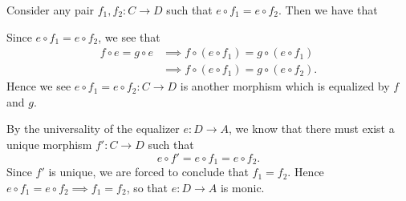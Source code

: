     \begin{prf}
    Consider any pair $f_1, f_2: C \to D$ such that $e \circ f_1 =
    e \circ f_2$. Then we have that 
    \begin{center}
    \end{center}
    Since $e \circ f_1 = e \circ f_2$, we see that 
    \begin{align*}
        f \circ e = g \circ e &\implies f \circ (e \circ f_1) = g \circ 
        (e \circ f_1)\\
        &\implies f \circ (e \circ f_1) = g \circ (e \circ f_2).
    \end{align*}
    Hence we see $e \circ f_1 = e \circ f_2 : C \to D$ is another
    morphism which is equalized by $f$ and $g$. 
    \begin{center}
    \end{center}
    By the
    universality of the equalizer $e: D \to A$, we know that there
    must exist a unique morphism $f': C \to D$ such that 
    \[
        e \circ f' = e \circ f_1 = e \circ f_2.
    \]
    Since $f'$ is unique, we are forced to conclude that $f_1 =
    f_2$. Hence $e \circ f_1 = e \circ f_2 \implies f_1 = f_2$, so
    that $e: D \to A$ is monic.
    \end{prf}

